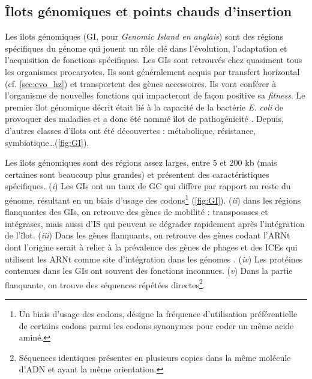 \newpage
\subsection{Îlots génomiques et points chauds d'insertion}
\label{sec:ilot}
Les îlots génomiques (GI, pour \textit{Genomic Island en anglais}) sont des régions spécifiques du génome qui jouent un rôle clé dans l'évolution, l'adaptation et l'acquisition de fonctions spécifiques. Les GIs sont retrouvés chez quasiment tous les organismes procaryotes. Ils sont généralement acquis par transfert horizontal (cf. \autoref{sec:evo_hz}) et transportent des gènes accessoires. Ils vont conférer à l'organisme de nouvelles fonctions qui impacteront de façon positive sa \textit{fitness}. Le premier îlot génomique décrit était lié à la capacité de la bactérie \textit{E. coli} de provoquer des maladies et a donc été nommé îlot de pathogénicité \cite{hacker_deletions_1990}.  Depuis, d'autres classes d'îlots ont été découvertes : métabolique, résistance, symbiotique\dots (\autoref{fig:GI}).

Les îlots génomiques sont des régions assez larges, entre 5 et 200 kb (mais certaines sont beaucoup plus grandes) et présentent des caractéristiques spécifiques. (\textit{i}) Les GIs ont un taux de GC qui diffère par rapport au reste du génome, résultant en un biais d'usage des codons\footnote{Un biais d'usage des codons, désigne la fréquence d’utilisation préférentielle de certains codons parmi les codons synonymes pour coder un même acide aminé.} (\autoref{fig:GI}). (\textit{ii}) dans les régions flanquantes des GIs, on retrouve des gènes de mobilité : transposases et intégrases, mais aussi d'IS qui peuvent se dégrader rapidement après l'intégration de l'îlot. (\textit{iii}) Dans les gènes flanquants, on retrouve des gènes codant l'ARNt dont l'origine serait à relier à la prévalence des gènes de phages et des ICEs qui utilisent les ARNt comme site d'intégration dans les génomes \cite{dobrindt_genomic_2004}. (\textit{iv}) Les protéines contenues dans les GIs ont souvent des fonctions inconnues. (\textit{v}) Dans la partie flanquante, on trouve des séquences répétées directes\footnote{Séquences identiques présentes en plusieurs copies dans la même molécule d'ADN et ayant la même orientation.}.

